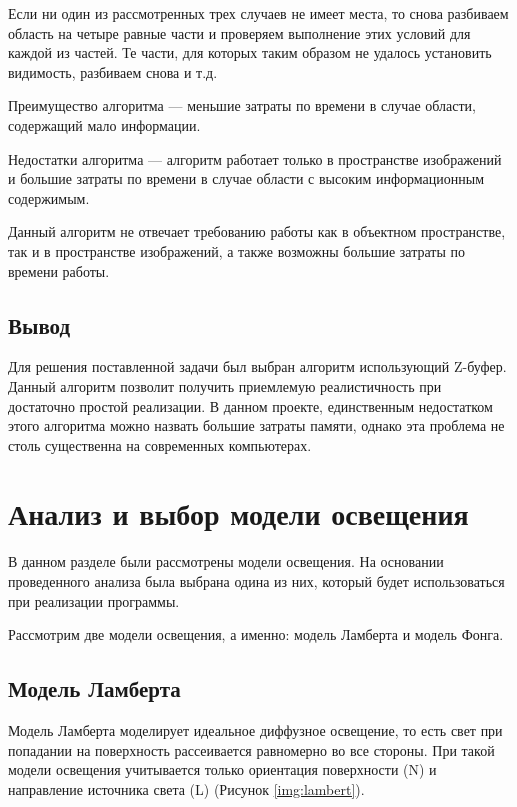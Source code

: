 Если ни один из рассмотренных трех случаев не имеет места, то снова разбиваем область на четыре равные части и проверяем выполнение этих условий для каждой из частей. Те части, для которых таким образом не удалось установить видимость, разбиваем снова и т.д.

Преимущество алгоритма --- меньшие затраты по времени в случае области, содержащий мало информации.

Недостатки алгоритма --- алгоритм работает только в пространстве изображений и большие затраты по времени в случае области с высоким информационным содержимым.

Данный алгоритм не отвечает требованию работы как в объектном пространстве, так и в пространстве изображений, а также возможны большие затраты по времени работы.

\subsection*{Вывод}

Для решения поставленной задачи был выбран алгоритм использующий Z-буфер. Данный алгоритм позволит получить приемлемую реалистичность при достаточно простой реализации. В данном проекте, единственным недостатком этого алгоритма можно назвать большие затраты памяти, однако эта проблема не столь существенна на современных компьютерах.

\section{Анализ и выбор модели освещения}

В данном разделе были рассмотрены модели освещения. На основании проведенного анализа была выбрана одина из них, который будет использоваться при реализации программы.

Рассмотрим две модели освещения, а именно: модель Ламберта и модель Фонга.

\subsection{Модель Ламберта}

Модель Ламберта моделирует идеальное диффузное освещение, то есть свет при попадании на поверхность рассеивается равномерно во все стороны. При такой модели освещения учитывается только ориентация поверхности (N) и направление источника света (L) (Рисунок \ref{img:lambert}). 

\newpage
{}

